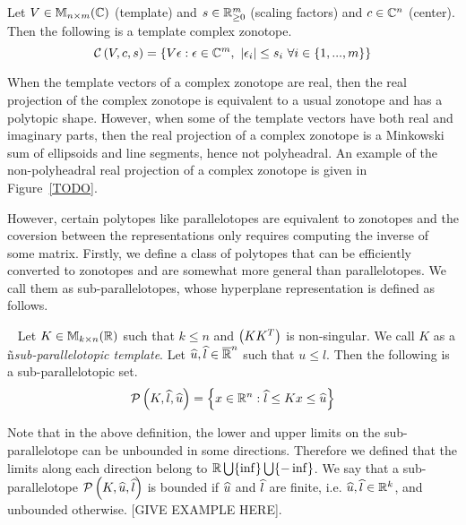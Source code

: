 \begin{definition}
Let $V\in\mathbb{M}_{n\times m}(\mathbb{\mathbb{C}})$ (template) and $s\in\mathbb{R}^m_{\geq 0}$ (scaling factors) and
$c\in\mathbb{C}^n$ (center).  Then the following is a template complex zonotope.
\begin{equation*}
\mathcal{C}\left(V,c,s\right) =
\left\{V\epsilon:\epsilon\in\mathbb{C}^m,~\left|\epsilon_i\right|\leq s_i~\forall
i\in\{1,...,m\}\right\}
\end{equation*}
\end{definition}

When the template vectors of a complex zonotope are real, then the
real projection of the complex zonotope is equivalent to a usual
zonotope and has a polytopic shape.  However, when some of the
template vectors have both real and imaginary parts, then the real
projection of a complex zonotope is a Minkowski sum of ellipsoids and
line segments, hence not polyheadral.  An example of the non-polyheadral
real projection of a complex zonotope is given in Figure~\ref{TODO}.


However, certain polytopes like parallelotopes are equivalent to
zonotopes and the coversion between the representations only requires
computing the inverse of some matrix.  Firstly, we define a class of
polytopes that can be efficiently converted to zonotopes and are
somewhat more general than parallelotopes. We call them as
sub-parallelotopes, whose hyperplane representation is defined as
follows.
%
\begin{definition}~\label{defn:sub-parallelotope} Let
  $K\in\mathbb{M}_{k\times n}(\mathbb{R})$ such that $k\leq n$ and $\left(KK^T\right)$ is
  non-singular.  We call $K$ as a ñ\emph{sub-parallelotopic template}.
  Let $\widehat{u},\widehat{l}\in\mathbb{\overline{R}}^n$ such that $u\leq l$.  Then the
  following is a sub-parallelotopic set.
\[
\mathcal{P}\left(K,\widehat{l},\widehat{u}\right) = \left\{x\in\mathbb{R}^n: \widehat{l}\leq Kx \leq \widehat{u}\right\}
\]
\end{definition}
Note that in the above definition, the lower and upper limits on the
sub-parallelotope can be unbounded in some directions.  Therefore we
defined that the limits along each direction belong to
$\mathbb{R}\bigcup\{\inf\}\bigcup\{-\inf\}$. We say that a
sub-parallelotope $\mathcal{P}\left(K,\widehat{u},\widehat{l}\right)$ is bounded if $\widehat{u}$
and $\widehat{l}$ are finite, i.e. $\widehat{u},\widehat{l}\in\mathbb{R}^k$, and
unbounded otherwise.  [GIVE EXAMPLE HERE].

